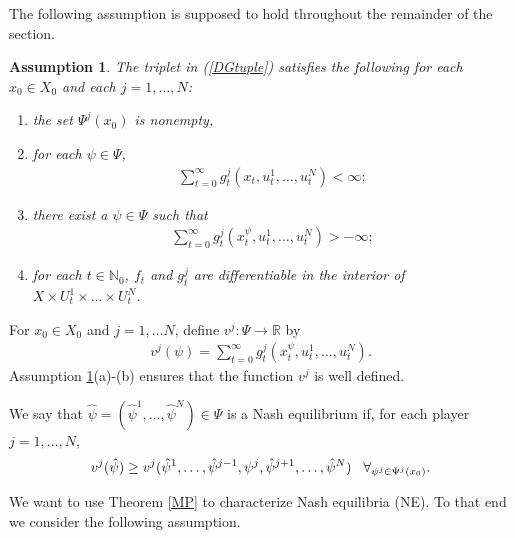 \documentclass[3p]{elsarticle}
\newcommand{\rz}{\mathbb R}
\newcommand{\nat}{\mathbb N_0}
\newtheorem{assu}[thm]{Assumption}
\begin{document}
	The following assumption is supposed to hold throughout the remainder of the section.
	
	
	\begin{assu}\label{DGWellPosed}
		The triplet in (\ref{DGtuple}) satisfies the following for each $x_0\in X_0$ and each $j=1,\dots,N$:
		\begin{enumerate}
			\item[(a)] the set $\Psi^j(x_0)$ is nonempty,
			
			\item[(b)] for each $\psi\in\Psi$, 
			\begin{align*}
			\sum_{t=0}^{\infty}g_t^j(x_t,u_t^1,\dots,u_t^N)<\infty;
			\end{align*}
			\item[(c)] there exist a $\psi\in\Psi$ such that 
			\begin{align*}
			\sum_{t=0}^\infty g_t^j(x_t^\psi,u_t^1,\dots,u_t^N)>-\infty;
			\end{align*}
			\item[(d)] for each $t\in\nat$, $f_t$ and $g^j_t$ are differentiable in the interior of $X\times U_t^1\times\dots\times U_t^N$.
		\end{enumerate}
	\end{assu}
	For $x_0\in X_0$ and $j=1,\dots N$, define $v^j:\Psi\to\rz$ by
	\begin{align}\label{DGPIv}
	v^j(\psi)=\sum_{t=0}^\infty g_t^j(x_t^\psi,u_t^1,\dots,u_t^N).
	\end{align}
	Assumption \ref{DGWellPosed}(a)-(b) ensures that the function $v^j$ is well defined.
	
	We say that $\hat{\psi}=(\hat\psi^1,\dots,\hat\psi^N)\in\Psi$ is a Nash equilibrium if, for each player $j=1,\dots,N$, 
	\begin{align*}
	v^j(\hat{\psi})\ge v^j(\hat\psi^1,\dots,\hat\psi^{j-1},\psi^j,\hat\psi^{j+1},\dots,\hat\psi^N)\hspace{0.3cm}\forall_{\psi^j\in\Psi^j(x_0)}.
	\end{align*} 
	
	
	We want to use Theorem \ref{MP} to characterize Nash equilibria (NE). To that end we consider the following  assumption.
	
	
	
\end{document}
